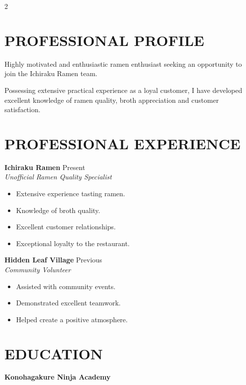 \documentclass[10pt,a4paper]{article}
\newcommand{\job}[4]{
    \textbf{\color{navy}#1}
    \hfill
    {\small\color{orange}#2}\\
    \textit{#3}\\
    #4
    \vspace{8pt}
}
\begin{document}
\begin{paracol}{2}
{\begin{minipage}[t]{0.88\linewidth}
\vspace{5pt}

\end{minipage}
}


\switchcolumn

\normalsize


\section*{PROFESSIONAL PROFILE}

Highly motivated and enthusiastic ramen
enthusiast seeking an opportunity to join
the Ichiraku Ramen team.

Possessing extensive practical experience
as a loyal customer, I have developed
excellent knowledge of ramen quality,
broth appreciation and customer satisfaction.

\section*{PROFESSIONAL EXPERIENCE}

\job
{Ichiraku Ramen}
{Present}
{Unofficial Ramen Quality Specialist}
{
\begin{itemize}
    \item Extensive experience tasting ramen.
    \item Knowledge of broth quality.
    \item Excellent customer relationships.
    \item Exceptional loyalty to the restaurant.
\end{itemize}
}

\job
{Hidden Leaf Village}
{Previous}
{Community Volunteer}
{
\begin{itemize}
    \item Assisted with community events.
    \item Demonstrated excellent teamwork.
    \item Helped create a positive atmosphere.
\end{itemize}
}

\section*{EDUCATION}

\textbf{Konohagakure Ninja Academy}


\end{paracol}
\end{document}
